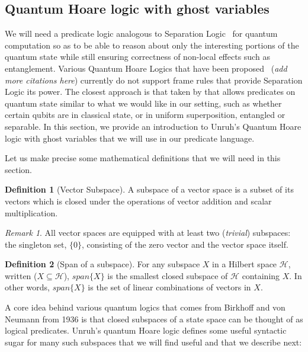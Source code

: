 \documentclass[adraft,creativecommons]{eptcs}
\theoremstyle{definition}
\newtheorem{definition}{Definition}[section]
\theoremstyle{remark}
\newtheorem*{remark}{Remark}
\begin{document}
\subsection{Quantum Hoare logic with ghost variables}

We will need a predicate logic analogous to Separation Logic~\cite{reynolds2002} for quantum computation so as to be able to reason about only the interesting portions of the quantum state while still ensuring correctness of non-local effects such as entanglement. Various Quantum Hoare Logics that have been proposed~\cite{floydhoare2012} (\textit{add more citations here}) currently do not support frame rules that provide Separation Logic its power. The closest approach is that taken by \cite{unruh2019} that allows predicates on quantum state similar to what we would like in our setting, such as whether certain qubits are in classical state, or in uniform superposition, entangled or separable. In this section, we provide an introduction to Unruh's Quantum Hoare logic with ghost variables that we will use in our predicate language.

Let us make precise some mathematical definitions that we will need in this section.

\begin{definition}[Vector Subspace]
	A subspace of a vector space is a subset of its vectors which is closed under the operations of vector addition and scalar multiplication.
\end{definition}

\begin{remark}
    All vector spaces are equipped with at least two (\textit{trivial}) subspaces: the singleton set, $\{ 0 \}$, consisting of the zero vector and the vector space itself.
\end{remark}

\begin{definition}[Span of a subspace]
	For any subspace $X$ in a Hilbert space $\mathcal{H}$, written ($X \subseteq \mathcal{H}$), $\mathit{span}\{X\}$ is the smallest closed subspace of $\mathcal{H}$ containing $X$. In other words, $\mathit{span}\{X\}$ is the set of linear combinations of vectors in $X$.
\end{definition}

A core idea behind various quantum logics that comes from Birkhoff and von Neumann from 1936 is that closed subspaces of a state space can be thought of as logical predicates. Unruh's quantum Hoare logic defines some useful syntactic sugar for many such subspaces that we will find useful and that we describe next:
\end{document}
